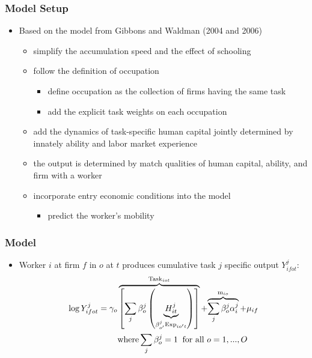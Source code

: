 \documentclass[10pt,svgnames,fragile]{beamer}
\begin{document}
{\begin{frame}
	\frametitle{Model Setup}
	\begin{itemize}
		\item Based on the model from  Gibbons and Waldman {\small (2004 and 2006)}
\vfill
		\begin{itemize}
			\item simplify the accumulation speed and the effect of schooling
\vfill
			\item follow the definition of occupation
			\begin{itemize}
				\vfill
				\item  define occupation as the collection of firms having the same task
				\vfill
				\item add the explicit task weights on each occupation 
			\end{itemize}
\vfill
\item add the dynamics of task-specific human capital jointly determined by innately ability and labor market experience 
\vfill
		\item the output is determined by match qualities of human capital, ability, and firm with a worker
		\vfill
	\item incorporate entry economic conditions into the model
		\begin{itemize}
			\vfill
			\item predict the worker's mobility
		\end{itemize}
		\vfill
		\end{itemize}
\end{itemize}
\end{frame}




\begin{frame}
	\frametitle{Model}
	\begin{itemize}
		\item Worker $i$ at firm $f$ in $o$ at $t$ produces cumulative task $j$ specific output $Y_{ifot}^j$:
		\begin{align}
			\log{Y_{ifot}^j} = \gamma_o&\overbrace{\left[  \sum_j \beta_{o}^j \left( \underbrace{H_{it}^{j}}_{\beta_{o'}^j \text{Exp}_{io't}}\right)  \right]}^{\text{Task}_{iot}} + {\overbrace{\sum_j \beta_{o}^j \alpha_{i}^j }^{\text{m}_{io}}+\mu_{if}}\\
			&\text{where} \sum_{j} \beta_{o}^j = 1 \;\;\text{for all }o=1,...,O \notag
		\end{align}
		

\end{itemize}
\end{frame}}
\end{document}
